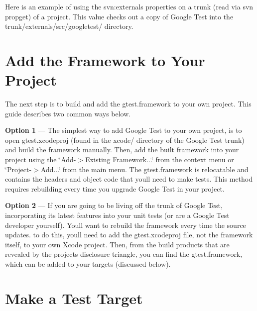 Here is an example of using the svn\+:externals properties on a trunk (read via {\ttfamily svn propget}) of a project. This value checks out a copy of Google Test into the {\ttfamily trunk/externals/src/googletest/} directory.


\begin{DoxyCode}{0}
\end{DoxyCode}


\section*{Add the Framework to Your Project}

The next step is to build and add the gtest.\+framework to your own project. This guide describes two common ways below.


\begin{DoxyItemize}
\item {\bfseries Option 1} --- The simplest way to add Google Test to your own project, is to open gtest.\+xcodeproj (found in the xcode/ directory of the Google Test trunk) and build the framework manually. Then, add the built framework into your project using the \char`\"{}\+Add-\/$>$\+Existing Framework...\char`\"{} from the context menu or \char`\"{}\+Project-\/$>$\+Add...\char`\"{} from the main menu. The gtest.\+framework is relocatable and contains the headers and object code that you\textquotesingle{}ll need to make tests. This method requires rebuilding every time you upgrade Google Test in your project.
\item {\bfseries Option 2} --- If you are going to be living off the trunk of Google Test, incorporating its latest features into your unit tests (or are a Google Test developer yourself). You\textquotesingle{}ll want to rebuild the framework every time the source updates. to do this, you\textquotesingle{}ll need to add the gtest.\+xcodeproj file, not the framework itself, to your own Xcode project. Then, from the build products that are revealed by the project\textquotesingle{}s disclosure triangle, you can find the gtest.\+framework, which can be added to your targets (discussed below).
\end{DoxyItemize}

\section*{Make a Test Target}

